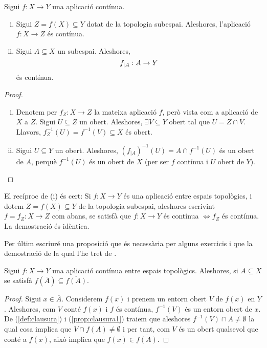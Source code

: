 \documentclass[../main.tex]{subfiles}
\begin{document}
\begin{prop}
\label{prop:continua4} Sigui $f:X\rightarrow Y$ una aplicació contínua.
\begin{enumerate}[(i)]
    \item Sigui $Z = f(X)\subseteq Y$ dotat de la topologia subespai. Aleshores, l'aplicació $f:X\rightarrow Z$ és contínua.
    \item Sigui $A\subseteq X$ un subespai. Aleshores,
    \begin{equation}
        \notag
        f_{|A}:A\rightarrow Y
    \end{equation}
    és contínua.
\end{enumerate}
\end{prop}
\begin{proof}
\begin{enumerate}[(i)]
    \item Denotem per $f_Z:X\rightarrow Z$ la mateixa aplicació $f$, però vista com a aplicació de $X$ a $Z$. Sigui $U\subseteq Z$ un obert. Aleshores, $\exists V\subseteq Y$ obert tal que $U = Z\cap V$. Llavors, $f_Z^{-1}(U) = f^{-1}(V)\subseteq X$ és obert.
    \item Sigui $U\subseteq Y$ un obert. Aleshores, $(f_{|A})^{-1}(U) = A\cap f^{-1}(U)$ és un obert de $A$, perquè $f^{-1}(U)$ és un obert de $X$ (per ser $f$ contínua i $U$ obert de $Y$).
\end{enumerate}
\end{proof}

\begin{nota}
\label{nota:continua4} El recíproc de (i) és cert: Si $f:X\rightarrow Y$ és una aplicació entre espais topològics, i dotem $Z = f(X)\subseteq Y$ de la topologia subespai, aleshores escrivint $f = f_Z:X\rightarrow Z  $ com abans, se satisfà que $f:X\rightarrow Y$ és contínua $\Leftrightarrow f_Z$ és contínua. La demostració és idèntica. 
\end{nota}

Per últim escriuré una proposició que és necessària per alguns exercicis i que la demostració de la qual l'he tret de \cite{random}.

\begin{prop}
\label{prop:continuasiiclausura} Sigui $f:X\rightarrow Y$ una aplicació contínua entre espais topològics. Aleshores, si $A\subseteq X$ se satisfà $f(\overline{A})\subseteq \overline{f(A)}$.
\end{prop}
\begin{proof}
Sigui $x\in \overline{A}$. Considerem $f(x)$ i prenem un entorn obert $V$ de $f(x)$ en $Y$. Aleshores, com $V$ conté $f(x)$ i $f$ és contínua, $f^{-1}(V)$ és un entorn obert de $x$. De (\ref{def:clausura}) i (\ref{prop:clausura1}) traiem que aleshores $f^{-1}(V)\cap A\not=\emptyset$ la qual cosa implica que $V\cap f(A)\not=\emptyset$ i per tant, com $V$ és un obert qualsevol que conté a $f(x)$, això implica que $f(x)\in \overline{f(A)}$.
\end{proof}
\end{document}
